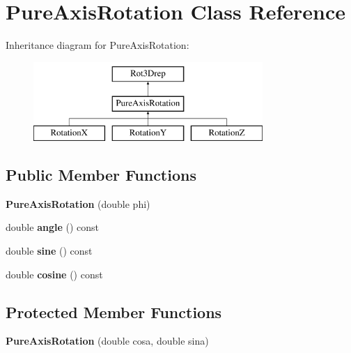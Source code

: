 \hypertarget{classPureAxisRotation}{}\section{Pure\+Axis\+Rotation Class Reference}
\label{classPureAxisRotation}
Inheritance diagram for Pure\+Axis\+Rotation\+:\begin{figure}[H]
\begin{center}
\leavevmode
\includegraphics[height=3.000000cm]{classPureAxisRotation}
\end{center}
\end{figure}
\subsection*{Public Member Functions}
\begin{DoxyCompactItemize}
\item 
\mbox{\label{classPureAxisRotation_a5fb7052999dc8b5bdb5c480b2f5cd348}} 
{\bfseries Pure\+Axis\+Rotation} (double phi)
\item 
\mbox{\label{classPureAxisRotation_ad828a30d86f03b94b993d254f3d537a3}} 
double {\bfseries angle} () const
\item 
\mbox{\label{classPureAxisRotation_aba3f1189c246be86dfd02df9265f412d}} 
double {\bfseries sine} () const
\item 
\mbox{\label{classPureAxisRotation_a8d5459ff0b6d7e465cfbe36d134e4d78}} 
double {\bfseries cosine} () const
\end{DoxyCompactItemize}
\subsection*{Protected Member Functions}
\begin{DoxyCompactItemize}
\item 
\mbox{\label{classPureAxisRotation_a3131513adc8dabbfee295f3c43a89bd4}} 
{\bfseries Pure\+Axis\+Rotation} (double cosa, double sina)
\end{DoxyCompactItemize}
